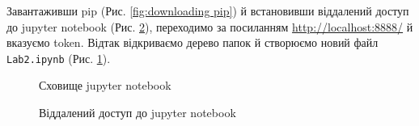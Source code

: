 \documentclass[a4paper,14pt]{extarticle} %
\begin{document}
Завантаживши pip (Рис. \ref{fig:downloading pip}) й встановивши віддалений доступ до jupyter notebook 
(Рис. \ref{fig:localhost}), переходимо за посиланням \url{http://localhost:8888/} й вказуємо token. Відтак відкриваємо 
дерево папок й створюємо новий файл \texttt{Lab2.ipynb} (Рис. \ref{fig:jupyter notebook}).

\begin{figure}[H]
    \caption{Сховище jupyter notebook}
    \label{fig:jupyter notebook}
\end{figure}

\begin{figure}[H]
    \begin{minipage}[H]{1\linewidth}
    \end{minipage}
    \vfill
    \begin{minipage}[H]{1\linewidth}
        \caption{Віддалений доступ до jupyter notebook}
        \label{fig:localhost}
    \end{minipage}
\end{figure}
\end{document}
